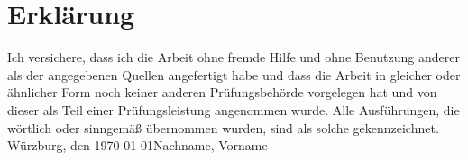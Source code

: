 \newpage

\thispagestyle{empty}
\section*{Erklärung}
\thispagestyle{empty}
Ich versichere, dass ich die Arbeit ohne fremde Hilfe und ohne Benutzung anderer als der angegebenen Quellen angefertigt habe und dass die Arbeit in gleicher oder ähnlicher Form noch keiner anderen Prüfungsbehörde vorgelegen hat und von dieser als Teil einer Prüfungsleistung angenommen wurde. Alle Ausführungen, die wörtlich oder sinngemäß übernommen wurden, sind als solche gekennzeichnet.
\vspace{4\baselineskip}\\
W{\"u}rzburg, den \today \hfill Nachname, Vorname
\vspace{4\baselineskip}\\
